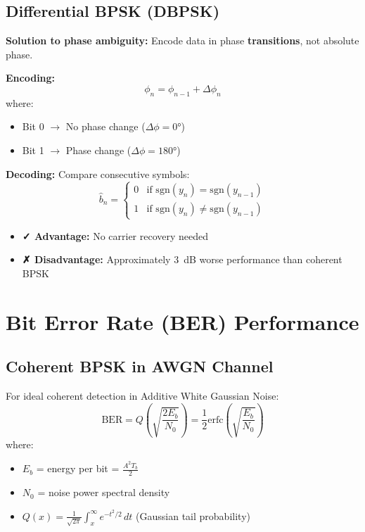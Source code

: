\subsection{Differential BPSK (DBPSK)}

\textbf{Solution to phase ambiguity:} Encode data in phase \textbf{transitions}, not absolute phase.

\textbf{Encoding:}
\begin{equation}
\phi_n = \phi_{n-1} + \Delta\phi_n
\end{equation}
where:
\begin{itemize}
\item Bit 0 $\rightarrow$ No phase change ($\Delta\phi = 0°$)
\item Bit 1 $\rightarrow$ Phase change ($\Delta\phi = 180°$)
\end{itemize}

\textbf{Decoding:} Compare consecutive symbols:
\begin{equation}
\hat{b}_n = \begin{cases}
0 & \text{if } \mathrm{sgn}(y_n) = \mathrm{sgn}(y_{n-1}) \\
1 & \text{if } \mathrm{sgn}(y_n) \neq \mathrm{sgn}(y_{n-1})
\end{cases}
\end{equation}

\begin{itemize}
\item \textbf{✓ Advantage:} No carrier recovery needed
\item \textbf{✗ Disadvantage:} Approximately 3~dB worse performance than coherent BPSK
\end{itemize}

\section{Bit Error Rate (BER) Performance}

\subsection{Coherent BPSK in AWGN Channel}

For ideal coherent detection in Additive White Gaussian Noise:
\begin{equation}
\mathrm{BER} = Q\left(\sqrt{\frac{2E_b}{N_0}}\right) = \frac{1}{2}\mathrm{erfc}\left(\sqrt{\frac{E_b}{N_0}}\right)
\end{equation}
where:
\begin{itemize}
\item $E_b$ = energy per bit = $\frac{A^2 T_b}{2}$
\item $N_0$ = noise power spectral density
\item $Q(x) = \frac{1}{\sqrt{2\pi}}\int_x^\infty e^{-t^2/2}\,dt$ (Gaussian tail probability)
\end{itemize}

